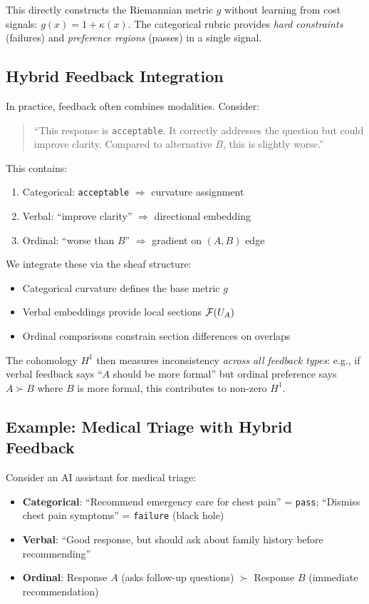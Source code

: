 This directly constructs the Riemannian metric $g$ without learning from cost signals: $g(x) = 1 + \kappa(x)$. The categorical rubric provides \emph{hard constraints} (failures) and \emph{preference regions} (passes) in a single signal.

\subsection{Hybrid Feedback Integration}

In practice, feedback often combines modalities. Consider:
\begin{quote}
``This response is \texttt{acceptable}. It correctly addresses the question but could improve clarity. Compared to alternative $B$, this is slightly worse.''
\end{quote}

This contains:
\begin{enumerate}
    \item Categorical: \texttt{acceptable} $\Rightarrow$ curvature assignment
    \item Verbal: ``improve clarity'' $\Rightarrow$ directional embedding
    \item Ordinal: ``worse than $B$'' $\Rightarrow$ gradient on $(A, B)$ edge
\end{enumerate}

We integrate these via the sheaf structure:
\begin{itemize}
    \item Categorical curvature defines the base metric $g$
    \item Verbal embeddings provide local sections $\mathcal{F}(U_A)$
    \item Ordinal comparisons constrain section differences on overlaps
\end{itemize}

The cohomology $H^1$ then measures inconsistency \emph{across all feedback types}: e.g., if verbal feedback says ``$A$ should be more formal'' but ordinal preference says $A \succ B$ where $B$ is more formal, this contributes to non-zero $H^1$.

\subsection{Example: Medical Triage with Hybrid Feedback}

Consider an AI assistant for medical triage:
\begin{itemize}
    \item \textbf{Categorical}: ``Recommend emergency care for chest pain'' = \texttt{pass}; ``Dismiss chest pain symptoms'' = \texttt{failure} (black hole)
    \item \textbf{Verbal}: ``Good response, but should ask about family history before recommending''
    \item \textbf{Ordinal}: Response $A$ (asks follow-up questions) $\succ$ Response $B$ (immediate recommendation)
\end{itemize}

